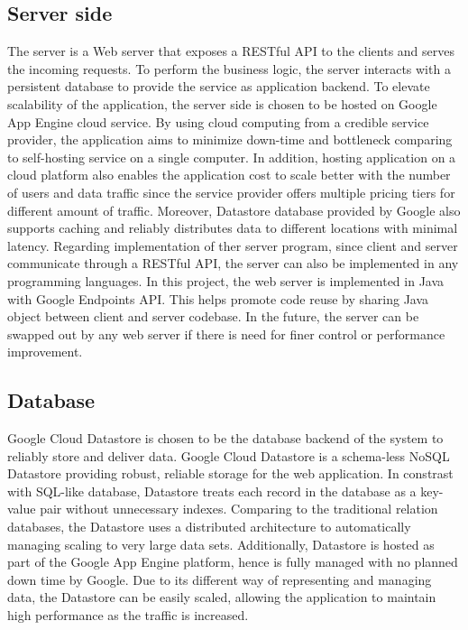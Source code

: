 \subsection{Server side}
The server is a Web server that exposes a RESTful API to the clients and serves the incoming requests. To perform the
business logic, the server interacts with a persistent database to provide the service as application backend. To
elevate scalability of the application, the server side is chosen to be hosted on Google App Engine cloud service. By
using cloud computing from a credible service provider, the application aims to minimize down-time and bottleneck
comparing to self-hosting service on a single computer.  In addition, hosting application on a cloud platform also
enables the application cost to scale better with the number of users and data traffic since the service provider offers
multiple pricing tiers for different amount of traffic.  Moreover, Datastore database provided by Google also supports
caching and reliably distributes data to different locations with minimal latency.  Regarding implementation of ther
server program, since client and server communicate through a RESTful API, the server can also be implemented in any
programming languages. In this project, the web server is implemented in Java with Google Endpoints API.  This helps
promote code reuse by sharing Java object between client and server codebase. In the future, the server can be swapped
out by any web server if there is need for finer control or performance improvement.

\subsection{Database}
Google Cloud Datastore is chosen to be the database backend of the system to reliably store and deliver data. Google
Cloud Datastore is a schema-less NoSQL Datastore providing robust, reliable storage for the web application. In
constrast with SQL-like database, Datastore treats each record in the database as a key-value pair without unnecessary
indexes. Comparing to the traditional relation databases, the Datastore uses a distributed architecture to automatically
managing scaling to very large data sets. Additionally, Datastore is hosted as part of the Google App Engine platform,
hence is fully managed with no planned down time by Google. Due to its different way of representing and managing data,
the Datastore can be easily scaled, allowing the application to maintain high performance as the traffic is increased.

